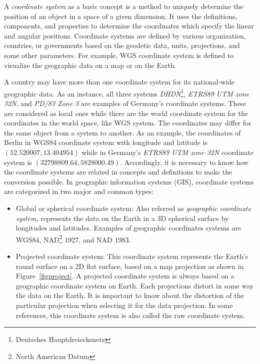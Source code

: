 \documentclass[a4paper,12pt]{article}
\begin{document}
A \emph{coordinate system} as a basic concept is a method to uniquely determine the position of an object in a space of a given dimension. It uses the definitions, components, and properties to determine the coordinates which specify the linear and angular positions. Coordinate systems are defined by various organization, countries, or governments based on the geodetic data, units, projections, and some other parameters. For example, WGS coordinate system is defined to visualize the geographic data on a map or on the Earth. 

A country may have more than one coordinate system for its national-wide geographic data. As an instance, all three systems \textit{DHDN}\footnote{Deutsches Hauptdreiecksnetz}, \textit{ETRS89 UTM zone 32N}, and \textit{PD/83 Zone 3} are examples of Germany's coordinate systems. These are considered as local ones while there are the world coordinate system for the coordinates in the world space, like WGS system. The coordinates may differ for the same object from a system to another. As an example, the coordinates of Berlin in WGS84 coordinate system with longitude and latitude is $(52.520007, 13.404954)$ while in Germany's \textit{ETRS89 UTM zone 32N} coordinate system is $(32798809.64, 5828000.49)$. Accordingly, it is necessary to know how the coordinate systems are related in concepts and definitions to make the conversion possible. 
In geographic information systems (GIS), coordinate systems are categorized in two major and common types:
\begin{itemize}
\item Global or spherical coordinate system: Also referred as \textit{geographic coordinate system}, represents the data on the Earth in a 3D spherical surface by longitudes and latitudes. Examples of geographic coordinates systems are WGS84, NAD\footnote{North American Datum} 1927, and NAD 1983. 

\item Projected coordinate system: This coordinate system represents the Earth's round surface on a 2D flat surface, based on a map projection as shown in Figure~\ref{figproject}. A projected coordinate system is always based on a geographic coordinate system on Earth. Each projections distort in some way the data on the Earth. It is important to know about the distortion of the particular projection when selecting it for the data projection. 
In some references, this coordinate system is also called the raw coordinate system.
\end{itemize}
\end{document}
